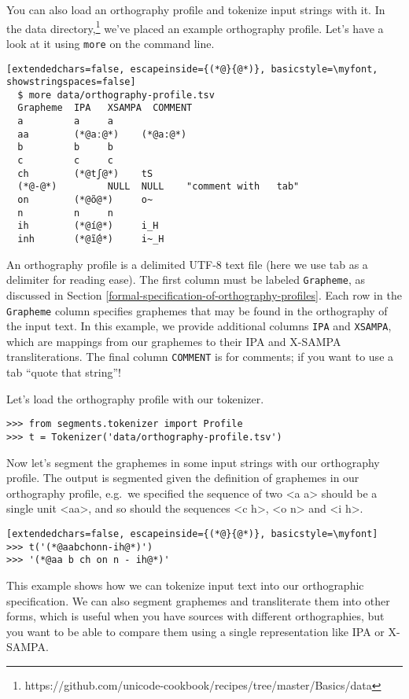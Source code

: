 \documentclass[output=book,nonflat,modfonts,
citecolor=brown,
		]{langsci/langscibook}\usepackage[]{graphicx}\usepackage[]{color}
\begin{document}
\noindent You can also load an orthography profile and tokenize input strings with it. In the data directory,\footnote{https://github.com/unicode-cookbook/recipes/tree/master/Basics/data} we've placed an example orthography profile. Let's have a look at it using \texttt{more} on the command line.


\begin{lstlisting}[extendedchars=false, escapeinside={(*@}{@*)}, basicstyle=\myfont, showstringspaces=false]
  $ more data/orthography-profile.tsv
  Grapheme  IPA   XSAMPA  COMMENT
  a         a     a
  aa        (*@aː@*)    (*@a:@*)
  b         b     b
  c         c     c
  ch        (*@tʃ@*)    tS
  (*@-@*)         NULL  NULL    "comment with   tab"
  on        (*@õ@*)     o~
  n         n     n
  ih        (*@í@*)     i_H
  inh       (*@ĩ́@*)     i~_H
\end{lstlisting}


\noindent An orthography profile is a delimited UTF-8 text file (here we use tab as a delimiter for reading ease). The first column must be labeled \texttt{Grapheme}, as discussed in Section \ref{formal-specification-of-orthography-profiles}. Each row in the \texttt{Grapheme} column specifies graphemes that may be found in the orthography of the input text. In this example, we provide additional columns \texttt{IPA} and \texttt{XSAMPA}, which are mappings from our graphemes to their IPA and X-SAMPA transliterations. The final column \texttt{COMMENT} is for comments; if you want to use a tab ``quote that     string''!

Let's load the orthography profile with our tokenizer.

\begin{lstlisting}[basicstyle=\myfont]
>>> from segments.tokenizer import Profile
>>> t = Tokenizer('data/orthography-profile.tsv')
\end{lstlisting}

\noindent Now let's segment the graphemes in some input strings with our orthography profile. The output is segmented given the definition of graphemes in our orthography profile, e.g.\ we specified the sequence of two <a a> should be a single unit <aa>, and so should the sequences <c h>, <o n> and <i h>.


\begin{lstlisting}[extendedchars=false, escapeinside={(*@}{@*)}, basicstyle=\myfont]
>>> t('(*@aabchonn-ih@*)')
>>> '(*@aa b ch on n - ih@*)'
\end{lstlisting}

\noindent This example shows how we can tokenize input text into our orthographic specification. We can also segment graphemes and transliterate them into other forms, which is useful when you have sources with different orthographies, but you want to be able to compare them using a single representation like IPA or X-SAMPA.
\end{document}

